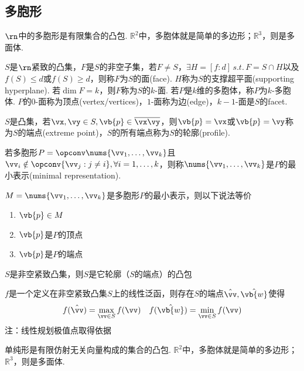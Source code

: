\subsection{多胞形}
\begin{definition}
$\rn$中的多胞形是有限集合的凸包. $\mathbb{R}^2$中，多胞体就是简单的多边形；$\mathbb{R}^3$，则是多面体.
\end{definition}
\begin{definition}
\rm $S$是$\rn$紧致的凸集，$F$是$S$的非空子集，若$F\ne S$，$\exists H=[f:d]\,s.t.\,F=S\cap H$以及$f(S)\leq d$或$f(S)\geq d$，则称$F$为$S$的面(face). $H$称为$S$的支撑超平面(supporting hyperplane). 若$\dim F=k$，则$F$称为$S$的$k$-面. 若$P$是$k$维的多胞体，称$P$为$k$-多胞体. $P$的$0$-面称为顶点(vertex/vertices)，$1$-面称为边(edge)，$k-1$-面是$S$的facet.
\end{definition}
\begin{definition}[端点]
\rm $S$是凸集，若$\vx,\vy\in S,\vb{p}\in\overline{\vx\vy}$，则$\vb{p}=\vx$或$\vb{p}=\vy$称为$S$的端点(extreme point)，$S$的所有端点称为$S$的轮廓(profile).
\end{definition}
\begin{definition}[最小表示]
\rm 若多胞形$P=\opconv\nums{\vv_1,\ldots,\vv_k}$且$\vv_i\notin\opconv\{\vv_j:j\ne i\},\forall i=1,\dots,k$，则称$\nums{\vv_1,\ldots,\vv_k}$是$P$的最小表示(minimal representation).
\end{definition}
\begin{theorem}
$M=\nums{\vv_1,\ldots,\vv_k}$是多胞形$P$的最小表示，则以下说法等价
\begin{enumerate}
	\itemsep -3pt
	\item $\vb{p}\in M$
	\item $\vb{p}$是$P$的顶点
	\item $\vb{p}$是$P$的端点
\end{enumerate}
\end{theorem}
\begin{theorem}
$S$是非空紧致凸集，则$S$是它轮廓（$S$的端点）的凸包
\end{theorem}
\begin{theorem}
$f$是一个定义在非空紧致凸集$S$上的线性泛函，则存在$S$的端点$\hat{\vv},\hat{\vb{w}}$使得
\[f(\hat{\vv})=\max_{\vv\in S}f(\vv)\quad f(\hat{\vb{w}})=\min_{\vv\in S}f(\vv)\]
注：线性规划极值点取得依据
\end{theorem}
\begin{definition}
单纯形是有限仿射无关向量构成的集合的凸包. $\mathbb{R}^2$中，多胞体就是简单的多边形；$\mathbb{R}^3$，则是多面体.
\end{definition}

